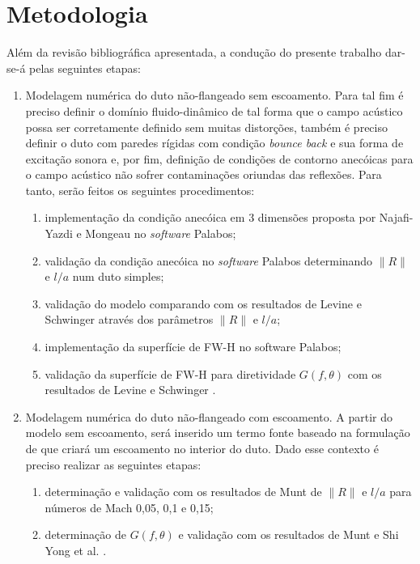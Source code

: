\chapter{Metodologia}
\label{chapter:metodologia}

Além da revisão bibliográfica apresentada, a condução do presente trabalho dar-se-á pelas seguintes etapas:
\begin{enumerate}
    \item Modelagem numérica do duto não-flangeado sem escoamento. Para tal fim é preciso definir o domínio fluido-dinâmico de tal forma que o campo acústico possa ser corretamente definido sem muitas distorções, também é preciso definir o duto com paredes rígidas com condição \textit{bounce back} e sua forma de excitação sonora e, por fim, definição de condições de contorno anecóicas para o campo acústico não sofrer contaminações oriundas das reflexões. Para tanto, serão feitos os seguintes procedimentos:
        \begin{enumerate}
            \item implementação da condição anecóica em 3 dimensões proposta por Najafi-Yazdi e Mongeau \cite{najafi2012absorbing} no \textit{software} Palabos;
            \item validação da condição anecóica no \textit{software} Palabos determinando $\|R\|$ e $l/a$ num duto simples;
            \item validação do modelo comparando com os resultados de Levine e Schwinger \cite{levine1948radiation} através dos parâmetros $\|R\|$ e $l/a$;
            \item implementação da superfície de FW-H no software Palabos;
            \item validação da superfície de FW-H para diretividade $G(f,\theta)$ com os resultados de Levine e Schwinger \cite{levine1948radiation}.
        \end{enumerate}
        
    \item Modelagem numérica do duto não-flangeado com escoamento. A partir do modelo sem escoamento, será inserido um termo fonte baseado na formulação de  que criará um escoamento no interior do duto. Dado esse contexto é preciso realizar as seguintes etapas:
        \begin{enumerate}
            \item determinação e validação com os resultados de Munt \cite{munt1990acoustic} de $\|R\|$ e $l/a$ para números de Mach 0,05, 0,1 e 0,15;
            \item determinação de $G(f,\theta)$ e validação com os resultados de Munt \cite{munt1990acoustic} e Shi Yong et al. \cite{shi2013lattice}.
        \end{enumerate}
        

\end{enumerate}
